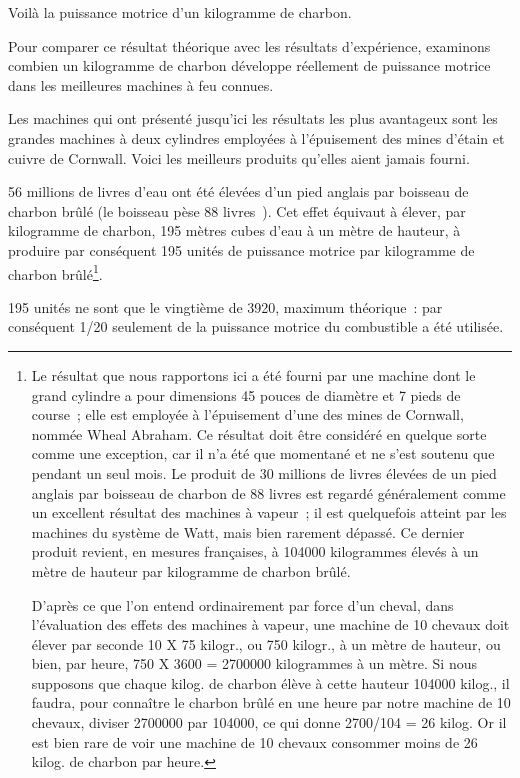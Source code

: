 \documentclass[french,twoside]{book} %
\begin{document}
\noindent Voilà la puissance motrice d’un kilogramme de charbon.\par
Pour comparer ce résultat théorique avec les résultats d’expérience, examinons combien un kilogramme de charbon développe réellement de puissance motrice dans les meilleures machines à feu connues.\par
Les machines qui ont présenté jusqu’ici les résultats les plus avantageux sont les grandes machines à deux cylindres employées à l’épuisement des mines d’étain et cuivre de Cornwall. Voici les meilleurs produits qu’elles aient jamais fourni.\par
56 millions de livres d’eau ont été élevées d’un pied anglais par boisseau de charbon brûlé (le boisseau pèse 88 livres ). Cet effet équivaut à élever, par kilogramme de charbon, 195 mètres cubes d’eau à un mètre de hauteur, à produire par conséquent 195 unités de puissance motrice par kilogramme de charbon brûlé\footnote{ \noindent Le résultat que nous rapportons ici a été fourni par une machine dont le grand cylindre a pour dimensions 45 pouces de diamètre et 7 pieds de course ; elle est employée à l’épuisement d’une des mines de Cornwall, nommée Wheal Abraham. Ce résultat doit être considéré en quelque sorte comme une exception, car il n’a été que momentané et ne s’est soutenu que pendant un seul mois. Le produit de 30 millions de livres élevées de un pied anglais par boisseau de charbon de 88 livres est regardé généralement comme un excellent résultat des machines à vapeur ; il est quelquefois atteint par les machines du système de Watt, mais bien rarement dépassé. Ce dernier produit revient, en mesures françaises, à 104000 kilogrammes élevés à un mètre de hauteur par kilogramme de charbon brûlé.\par
 D’après ce que l’on entend ordinairement par force d’un cheval, dans l’évaluation des effets des machines à vapeur, une machine de 10 chevaux doit élever par seconde 10 X 75 kilogr., ou 750 kilogr., à un mètre de hauteur, ou bien, par heure, 750 X 3600 = 2700000 kilogrammes à un mètre. Si nous supposons que chaque kilog. de charbon élève à cette hauteur 104000 kilog., il faudra, pour connaître le charbon brûlé en une heure par notre machine de 10 chevaux, diviser 2700000 par 104000, ce qui donne 2700/104 = 26 kilog. Or il est bien rare de voir une machine de 10 chevaux consommer moins de 26 kilog. de charbon par heure.
 }.\par
195 unités ne sont que le vingtième de 3920, maximum théorique : par conséquent 1/20 seulement de la puissance motrice du combustible a été utilisée.\par
\end{document}
